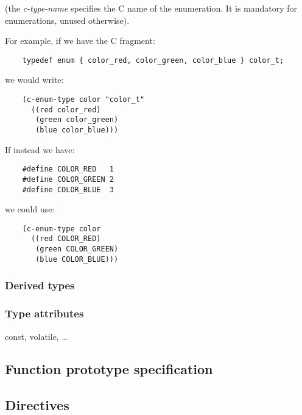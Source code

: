 \documentclass[10pt,twocolumn]{article}
\begin{document}
(the \textsl{c-type-name} specifies the C name of the enumeration. It
is mandatory for enumerations, unused otherwise).\par

For example, if we have the C fragment:

\begin{verbatim}
    typedef enum { color_red, color_green, color_blue } color_t;
\end{verbatim}

we would write:

\begin{verbatim}
    (c-enum-type color "color_t"
      ((red color_red)
       (green color_green)
       (blue color_blue)))
\end{verbatim}

If instead we have:

\begin{verbatim}
    #define COLOR_RED   1
    #define COLOR_GREEN 2
    #define COLOR_BLUE  3
\end{verbatim}

we could use:

\begin{verbatim}
    (c-enum-type color
      ((red COLOR_RED)
       (green COLOR_GREEN)
       (blue COLOR_BLUE)))
\end{verbatim}

\subsubsection{Derived types}

\subsubsection{Type attributes}

const, volatile, \dots

\subsection{Function prototype specification}

\subsection{Directives}
\end{document}
